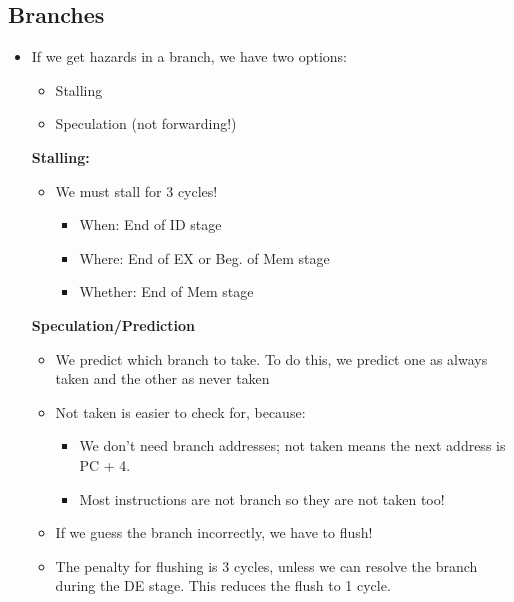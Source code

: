 \documentclass[10pt]{article}
\begin{document}
\subsection*{Branches}
\begin{itemize}
    \item If we get hazards in a branch, we have two options:
    \begin{itemize}
        \item Stalling
        \item Speculation (not forwarding!)
    \end{itemize}
    \textbf{Stalling:}
    \begin{itemize}
        \item We must stall for 3 cycles!
            \begin{itemize}
                \item When: End of ID stage
                \item Where: End of EX or Beg. of Mem stage
                \item Whether: End of Mem stage
            \end{itemize}
    \end{itemize}
    \textbf{Speculation/Prediction}
    \begin{itemize}
        \item We predict which branch to take.  To do this, we predict one as always taken and the other as never taken
        \item Not taken is easier to check for, because:
        \begin{itemize}
            \item We don't need branch addresses; not taken means the next address is PC + 4.
            \item Most instructions are not branch so they are not taken too!
        \end{itemize}
        \item If we guess the branch incorrectly, we have to flush!
        \item The penalty for flushing is 3 cycles, unless we can resolve the branch during the DE stage.  This reduces the flush to 1 cycle.
    \end{itemize}
\end{itemize}
\end{document}
